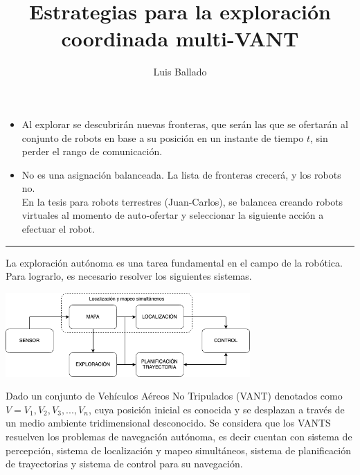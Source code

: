 \documentclass[12pt]{article}
\begin{document}
 
 
\title{Estrategias para la exploración coordinada multi-VANT}%
\author{Luis Ballado} %
 
\maketitle

\begin{itemize}
\item Al explorar se descubrirán nuevas fronteras, que serán las que se ofertarán al conjunto de robots en base a su posición en un instante de tiempo $t$, sin perder el rango de comunicación. 
\item No es una asignación balanceada. La lista de fronteras crecerá, y los robots no.\\
  En la tesis para robots terrestres (Juan-Carlos), se balancea creando robots virtuales al momento de auto-ofertar y seleccionar la siguiente acción a efectuar el robot.
\end{itemize}

\vspace{1cm}
\hrule
\vspace{1cm}

La exploración autónoma es una tarea fundamental en el campo de la robótica. Para lograrlo, es necesario resolver los siguientes sistemas.

\begin{center}
\includegraphics[width=0.7\textwidth]{exploracion}
\end{center}
\vspace{0.5cm}
Dado un conjunto de Vehículos Aéreos No Tripulados (VANT) denotados como $V = {V_{1}, V_{2}, V_{3},...,V_{n}}$, cuya posición inicial es conocida y se desplazan a través de un medio ambiente tridimensional desconocido. Se considera que los VANTS resuelven los problemas de navegación autónoma, es decir cuentan con sistema de percepción, sistema de localización y mapeo simultáneos, sistema de planificación de trayectorias y sistema de control para su navegación. \\
\end{document}
